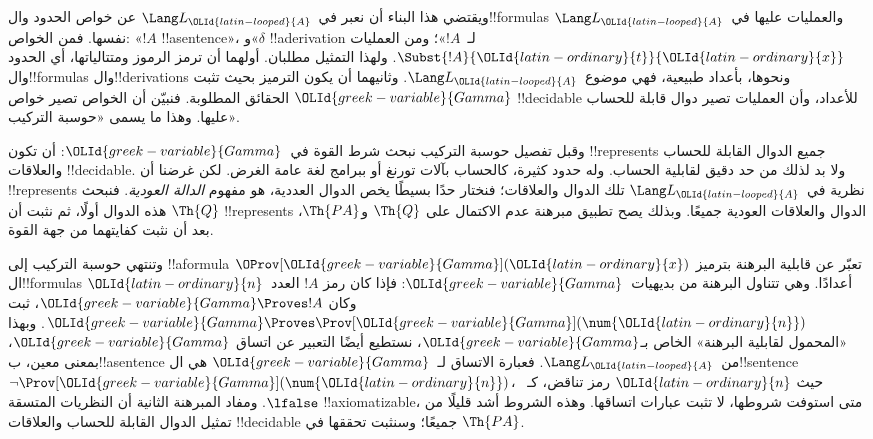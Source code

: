 \documentclass[../../../include/open-logic-section]{subfiles}
\begin{document}
ويقتضي هذا البناء أن نعبر في~$\Lang L_\OLId{latin-looped}{A}$
عن خواص الحدود وال!!{formula}s والعمليات
عليها في~$\Lang L_\OLId{latin-looped}{A}$ نفسها. فمن الخواص:
«$!A$ !!a{sentence}»، و«$\delta$
!!a{derivation} لـ~$!A$»؛ ومن العمليات
$\Subst{!A}{\OLId{latin-ordinary}{t}}{\OLId{latin-ordinary}{x}}$. ولهذا التمثيل مطلبان.
أولهما أن ترمز الرموز ومتتالياتها، أي الحدود
وال!!{formula}s وال!!{derivation}s ونحوها،
بأعداد طبيعية، فهي موضوع~$\Lang L_\OLId{latin-looped}{A}$.
وثانيهما أن يكون الترميز بحيث تثبت $\OLId{greek-variable}{Gamma}$
الحقائق المطلوبة. فنبيّن أن الخواص تصير
خواص !!{decidable} للأعداد، وأن العمليات
تصير دوال قابلة للحساب عليها. وهذا ما يسمى
«حوسبة التركيب».

وقبل تفصيل حوسبة التركيب نبحث شرط القوة
في~$\OLId{greek-variable}{Gamma}$: أن تكون !!{represents} جميع
الدوال القابلة للحساب والعلاقات !!{decidable}.
ولا بد لذلك من حد دقيق لقابلية الحساب.
وله حدود كثيرة، كالحساب بآلات تورنغ أو
ببرامج لغة عامة الغرض. لكن غرضنا أن
!!{represents} نظرية في~$\Lang L_\OLId{latin-looped}{A}$
تلك الدوال والعلاقات؛ فنختار حدًا بسيطًا
يخص الدوال العددية، هو مفهوم \emph{الدالة
العودية}. فنبحث هذه الدوال أولًا، ثم نثبت
أن $\Th{Q}$ !!{represents} الدوال والعلاقات
العودية جميعًا. وبذلك يصح تطبيق مبرهنة
عدم الاكتمال على $\Th{Q}$ و$\Th{PA}$،
بعد أن نثبت كفايتهما من جهة القوة.

وتنتهي حوسبة التركيب إلى !!a{formula}
$\OProv[\OLId{greek-variable}{Gamma}](\OLId{latin-ordinary}{x})$ تعبّر عن قابلية البرهنة
بترميز ال!!{formula}s أعدادًا. وهي تتناول
البرهنة من بديهيات~$\OLId{greek-variable}{Gamma}$: فإذا كان
رمز $!A$ العدد~$\OLId{latin-ordinary}{n}$ وكان $\OLId{greek-variable}{Gamma}\Proves !A$،
ثبت $\OLId{greek-variable}{Gamma}\Proves\Prov[\OLId{greek-variable}{Gamma}](\num{\OLId{latin-ordinary}{n}})$.
وبهذا «المحمول لقابلية البرهنة» الخاص
بـ$\OLId{greek-variable}{Gamma}$، نستطيع أيضًا التعبير عن اتساق
$\OLId{greek-variable}{Gamma}$، بمعنى معين، ب!!a{sentence}
من~$\Lang L_\OLId{latin-looped}{A}$. فعبارة الاتساق
لـ~$\OLId{greek-variable}{Gamma}$ هي ال!!{sentence}
$\lnot\Prov[\OLId{greek-variable}{Gamma}](\num{\OLId{latin-ordinary}{n}})$، حيث
$\OLId{latin-ordinary}{n}$ رمز تناقض، كـ~$\lfalse$.
ومفاد المبرهنة الثانية أن النظريات المتسقة
!!{axiomatizable}، متى استوفت شروطها،
لا تثبت عبارات اتساقها. وهذه الشروط
أشد قليلًا من تمثيل الدوال القابلة
للحساب والعلاقات !!{decidable} جميعًا؛
وسنثبت تحققها في $\Th{PA}$.
\end{document}
